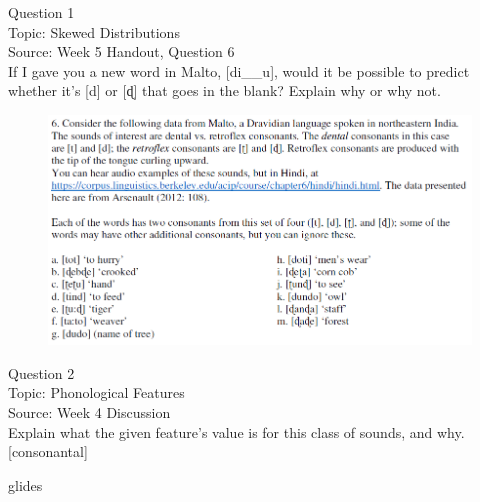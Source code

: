 \documentclass[12pt]{article}
\begin{document}
{\large Question 1}\\

Topic: Skewed Distributions\\
Source: Week 5 Handout, Question 6\\

If I gave you a new word in Malto, [di\_\_u], would it be possible to predict whether it's [d] or [ɖ] that goes in the blank? Explain why or why not.\\

\begin{figure}[H]
\includegraphics{../images/malto.png}
\end{figure}

\newpage

{\large Question 2}\\

Topic: Phonological Features\\
Source: Week 4 Discussion\\

Explain what the given feature’s value is for this class of sounds, and why.\\

{[consonantal]}

glides


\newpage

\begin{center}
\textbf{{\color{red}{\HUGE END OF EXAM}}}\\

\end{center}
\newpage

\begin{center}
\textbf{{\color{blue}{\HUGE START OF EXAM\\}}}

\textbf{{\color{blue}{\HUGE Student ID: 94263\\}}}

\textbf{{\color{blue}{\HUGE 4:20\\}}}

\end{center}
\newpage
\end{document}
